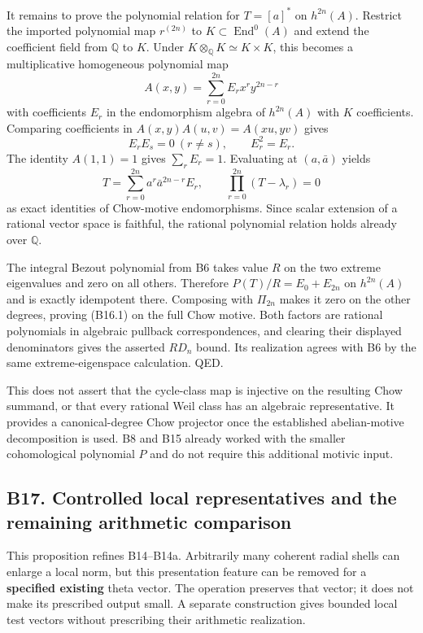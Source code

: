 \documentclass[11pt,a4paper]{article}
\theoremstyle{definition}
\begin{document}
It remains to prove the polynomial relation for \(T=[a]^*\) on \(h^{2n}(A)\). Restrict the imported polynomial map \(r^{(2n)}\) to \(K\subset\operatorname{End}^0(A)\) and extend the coefficient field from \(\mathbb Q\) to \(K\). Under \(K\otimes_{\mathbb Q}K\simeq K\times K\), this becomes a multiplicative homogeneous polynomial map \[
 A(x,y)=\sum_{r=0}^{2n}E_r x^r y^{2n-r}
\] with coefficients \(E_r\) in the endomorphism algebra of \(h^{2n}(A)\) with \(K\) coefficients. Comparing coefficients in \(A(x,y)A(u,v)=A(xu,yv)\) gives \[
 E_rE_s=0\ (r\ne s),\qquad E_r^2=E_r.
\] The identity \(A(1,1)=1\) gives \(\sum_r E_r=1\). Evaluating at \((a,\bar a)\) yields \[
 T=\sum_{r=0}^{2n}a^r\bar a^{2n-r}E_r,
 \qquad \prod_{r=0}^{2n}(T-\lambda_r)=0
\] as exact identities of Chow-motive endomorphisms. Since scalar extension of a rational vector space is faithful, the rational polynomial relation holds already over \(\mathbb Q\).

The integral Bezout polynomial from B6 takes value \(R\) on the two extreme eigenvalues and zero on all others. Therefore \(P(T)/R=E_0+E_{2n}\) on \(h^{2n}(A)\) and is exactly idempotent there. Composing with \(\Pi_{2n}\) makes it zero on the other degrees, proving (B16.1) on the full Chow motive. Both factors are rational polynomials in algebraic pullback correspondences, and clearing their displayed denominators gives the asserted \(R D_n\) bound. Its realization agrees with B6 by the same extreme-eigenspace calculation. QED.

This does not assert that the cycle-class map is injective on the resulting Chow summand, or that every rational Weil class has an algebraic representative. It provides a canonical-degree Chow projector once the established abelian-motive decomposition is used. B8 and B15 already worked with the smaller cohomological polynomial \(P\) and do not require this additional motivic input.

\subsection{B17. Controlled local representatives and the remaining arithmetic comparison}\label{b17.-controlled-local-representatives-and-the-remaining-arithmetic-comparison}

This proposition refines B14--B14a. Arbitrarily many coherent radial shells can enlarge a local norm, but this presentation feature can be removed for a \textbf{specified existing} theta vector. The operation preserves that vector; it does not make its prescribed output small. A separate construction gives bounded local test vectors without prescribing their arithmetic realization.
\end{document}
